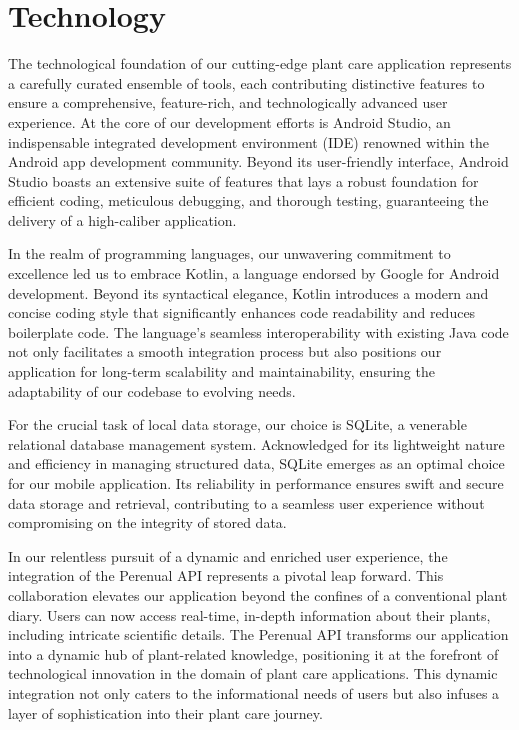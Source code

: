 \documentclass{sigchi}
\begin{document}
\section{Technology}
The technological foundation of our cutting-edge plant care application represents a carefully curated ensemble of tools, each contributing distinctive features to ensure a comprehensive, feature-rich, and technologically advanced user experience. At the core of our development efforts is Android Studio, an indispensable integrated development environment (IDE) renowned within the Android app development community. Beyond its user-friendly interface, Android Studio boasts an extensive suite of features that lays a robust foundation for efficient coding, meticulous debugging, and thorough testing, guaranteeing the delivery of a high-caliber application.

In the realm of programming languages, our unwavering commitment to excellence led us to embrace Kotlin, a language endorsed by Google for Android development. Beyond its syntactical elegance, Kotlin introduces a modern and concise coding style that significantly enhances code readability and reduces boilerplate code. The language's seamless interoperability with existing Java code not only facilitates a smooth integration process but also positions our application for long-term scalability and maintainability, ensuring the adaptability of our codebase to evolving needs.


For the crucial task of local data storage, our choice is SQLite, a venerable relational database management system. Acknowledged for its lightweight nature and efficiency in managing structured data, SQLite emerges as an optimal choice for our mobile application. Its reliability in performance ensures swift and secure data storage and retrieval, contributing to a seamless user experience without compromising on the integrity of stored data.

In our relentless pursuit of a dynamic and enriched user experience, the integration of the Perenual API represents a pivotal leap forward. This collaboration elevates our application beyond the confines of a conventional plant diary. Users can now access real-time, in-depth information about their plants, including intricate scientific details. The Perenual API transforms our application into a dynamic hub of plant-related knowledge, positioning it at the forefront of technological innovation in the domain of plant care applications. This dynamic integration not only caters to the informational needs of users but also infuses a layer of sophistication into their plant care journey.
\end{document}
